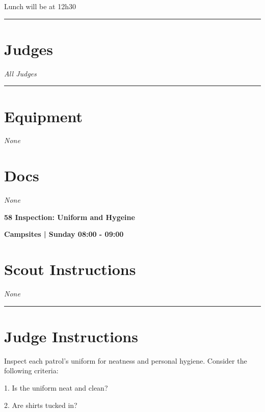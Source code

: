 \documentclass[10pt]{article}
\newcommand{\newtitle}[1]{\begin{center}{\Huge\bfseries #1 }\\ \vspace{5mm}\end{center}}
\newcommand{\newsubtitle}[1]{\begin{center}{\color{grey}\Large\bfseries #1 }\\ \vspace{5mm}\end{center}}
\begin{document}
Lunch will be at 12h30
\vspace{0.5cm}
	\hrule
	\vspace{0.5cm}
		\section*{\faUsers \: Judges}

					\textit{All Judges}
			\vspace{0.5cm}
	\hrule
	\vspace{0.5cm}

	\begin{multicols}{2}

		\section*{\faWrench \: Equipment}

				\textit{None}
		
		\vfill\null
		\columnbreak

			\section*{\faFile \: Docs}
		 	\textit{None}
	

		\vfill\null

		\end{multicols}



	\vspace{1cm}


	\clearpage
		\newtitle{58 Inspection: Uniform and Hygeine }
	\newsubtitle{Campsites | Sunday 08:00 - 09:00}
		\setcounter{section}{57}
	\section*{Scout Instructions}
		\textit{None}
	
	\vspace{0.5cm}
	\hrule
	\vspace{0.5cm}

		\section*{Judge Instructions}
		Inspect each patrol's uniform for neatness and personal hygiene. Consider the following criteria:



1. Is the uniform neat and clean?

2. Are shirts tucked in?
\end{document}
